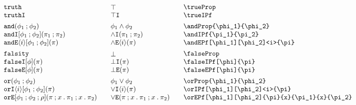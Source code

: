 \documentclass[11pt]{article}
\begin{document}
\begin{figure}
  
  \begin{small}
    \begin{displaymath}
      \begin{array}{l@{\qquad}l@{\qquad}l@{\qquad}l}
        \trueProp                                       & \trueProp*                       & \verb|\trueProp|                                       \\
        \trueIPf                                        & \trueIPf*                        & \verb|\trueIPf|                                        \\[1ex]
  
        \andProp{\phi_1}{\phi_2}                        & \andProp*{\phi_1}{\phi_2}        & \verb|\andProp{\phi_1}{\phi_2}|                        \\
        \andIPf{\pi_1}{\pi_2}                           & \andIPf*{\pi_1}{\pi_2}           & \verb|\andIPf{\pi_1}{\pi_2}|                           \\
        \andEPf[\phi_1][\phi_2]<i>{\pi}                 & \andEPf*<i>{\pi}                 & \verb|\andEPf[\phi_1][\phi_2]<i>{\pi}|                 \\[1ex]
  
        \falseProp                                      & \falseProp*                      & \verb|\falseProp|                                      \\
        \falseIPf[\phi]{\pi}                            & \falseIPf*{\pi}                  & \verb|\falseIPf[\phi]{\pi}|                            \\
        \falseEPf[\phi]{\pi}                            & \falseEPf*{\pi}                  & \verb|\falseEPf[\phi]{\pi}|                            \\[1ex]
  
        \orProp{\phi_1}{\phi_2}                         & \orProp*{\phi_1}{\phi_2}         & \verb|\orProp{\phi_1}{\phi_2}|                         \\
        \orIPf[\phi_1][\phi_2]<i>{\pi}                  & \orIPf*<i>{\pi}                  & \verb|\orIPf[\phi_1][\phi_2]<i>{\pi}|                  \\
        \orEPf[\phi_1][\phi_2]{\pi}{x}{\pi_1}{x}{\pi_2} & \orEPf*{\pi}{x}{\pi_1}{x}{\pi_2} & \verb|\orEPf[\phi_1][\phi_2]{\pi}{x}{\pi_1}{x}{\pi_2}| \\[1ex]
  

\end{array}
\end{displaymath}
\end{small}
\end{figure}
\end{document}
